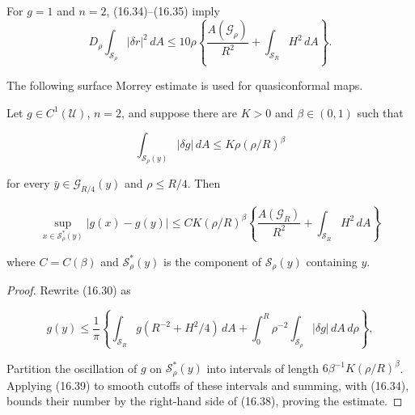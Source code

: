 For $g=1$ and $n=2$, (16.34)--(16.35) imply
\begin{equation}
D_\rho\int_{\mathcal S_\rho}|\delta r|^2\,dA
\le10\rho\left\{\frac{A(\mathcal G_\rho)}{R^2}
+\int_{\mathcal S_R}H^2\,dA\right\}.
\tag{16.36}
\end{equation}

The following surface Morrey estimate is used for quasiconformal maps.

\begin{lemma}\label{gilbarg-trudinger.lem.16.4.surface-morrey-estimate}
Let $g\in C^{1}(\mathcal U)$, $n=2$, and suppose there are $K>0$ and $\beta\in(0,1)$ such that

\begin{equation}
\int_{\mathcal S_{\rho}(y)}|\delta g|\,dA\le K\rho(\rho/R)^{\beta}
\tag{16.37}
\end{equation}

for every $\bar y\in \mathcal G_{R/4}(y)$ and $\rho\le R/4$. Then

\begin{equation}
\sup_{x\in \mathcal S^*_{\rho}(y)}|g(x)-g(y)|\le CK(\rho/R)^{\beta}\left\{\frac{A(\mathcal G_{R})}{R^{2}}+\int_{\mathcal S_{R}}H^{2}\,dA\right\}
\tag{16.38}
\end{equation}


where $C=C(\beta)$ and $\mathcal{S}^*_\rho(y)$ is the component of $\mathcal{S}_\rho(y)$ containing $y$.
\end{lemma}

\begin{proof}
\sketch Rewrite (16.30) as

\begin{equation}
g(y)\le \frac{1}{\pi}\left\{\int_{\mathcal{S}_R} g\left(R^{-2}+H^2/4\right)\,dA
+ \int_0^R \rho^{-2}\int_{\mathcal{S}_\rho} |\delta g|\,dA\,d\rho\right\},
\tag{16.39}
\end{equation}

Partition the oscillation of $g$ on $\mathcal S^*_\rho(y)$ into intervals of length
$6\beta^{-1}K(\rho/R)^\beta$. Applying (16.39) to smooth cutoffs of these intervals and
summing, with (16.34), bounds their number by the right-hand side of (16.38), proving the estimate.

\end{proof}

